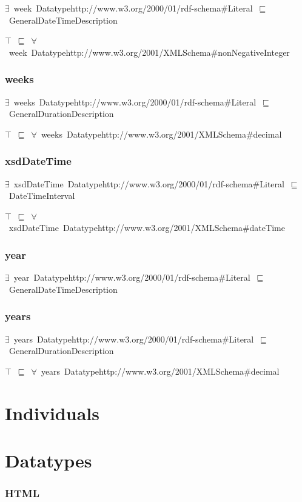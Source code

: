 \documentclass{article}
\begin{document}
\ensuremath{\exists}~week~Datatypehttp://www.w3.org/2000/01/rdf-schema#Literal~\ensuremath{\sqsubseteq}~GeneralDateTimeDescription

\ensuremath{\top}~\ensuremath{\sqsubseteq}~\ensuremath{\forall}~week~Datatypehttp://www.w3.org/2001/XMLSchema#nonNegativeInteger

\subsubsection*{weeks}

\ensuremath{\exists}~weeks~Datatypehttp://www.w3.org/2000/01/rdf-schema#Literal~\ensuremath{\sqsubseteq}~GeneralDurationDescription

\ensuremath{\top}~\ensuremath{\sqsubseteq}~\ensuremath{\forall}~weeks~Datatypehttp://www.w3.org/2001/XMLSchema#decimal

\subsubsection*{xsdDateTime}

\ensuremath{\exists}~xsdDateTime~Datatypehttp://www.w3.org/2000/01/rdf-schema#Literal~\ensuremath{\sqsubseteq}~DateTimeInterval

\ensuremath{\top}~\ensuremath{\sqsubseteq}~\ensuremath{\forall}~xsdDateTime~Datatypehttp://www.w3.org/2001/XMLSchema#dateTime

\subsubsection*{year}

\ensuremath{\exists}~year~Datatypehttp://www.w3.org/2000/01/rdf-schema#Literal~\ensuremath{\sqsubseteq}~GeneralDateTimeDescription

\subsubsection*{years}

\ensuremath{\exists}~years~Datatypehttp://www.w3.org/2000/01/rdf-schema#Literal~\ensuremath{\sqsubseteq}~GeneralDurationDescription

\ensuremath{\top}~\ensuremath{\sqsubseteq}~\ensuremath{\forall}~years~Datatypehttp://www.w3.org/2001/XMLSchema#decimal

\section*{Individuals}\section*{Datatypes}\subsubsection*{HTML}
\end{document}
